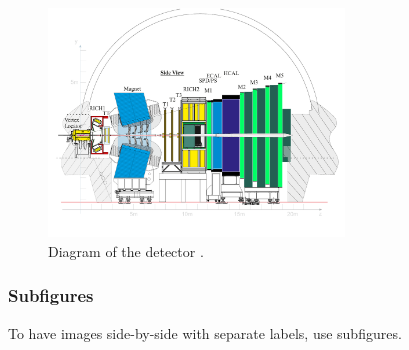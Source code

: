 \documentclass[a4paper]{article}
\begin{document}
\begin{figure}[ht]
    \centering
    \includegraphics[clip, trim=0.5cm 2cm 0.5cm 0cm,width=0.7\textwidth]{figures/lhcb.pdf}
    \caption{Diagram of the \lhcb detector \cite{LHCbDetectorGeometry}.}
    \label{fig:lhcb}
\end{figure}

\subsubsection{Subfigures}
\label{sec:theory_figures_subfigures}
To have images side-by-side with separate labels, use subfigures.
\end{document}
